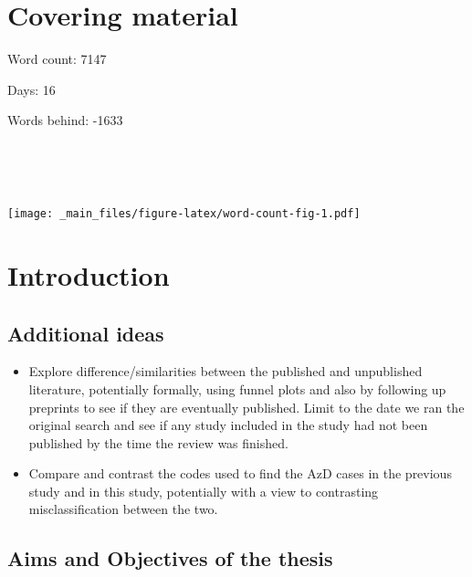 \documentclass[a4paper, twoside]{templates/ociamthesis}
\providecommand{\tightlist}{%
  \setlength{\itemsep}{0pt}\setlength{\parskip}{0pt}}
\begin{document}
\flushbottom

\hypertarget{covering-material}{%
\chapter*{Covering material}\label{covering-material}}

\adjustmtc

Word count: 7147

Days: 16

Words behind: -1633

~

~

\texttt{[image: \_main\_files/figure-latex/word-count-fig-1.pdf]}

\hypertarget{intro-heading}{%
\chapter{Introduction}\label{intro-heading}}

\minitoc 

\hypertarget{additional-ideas}{%
\section{Additional ideas}\label{additional-ideas}}

\begin{itemize}
\tightlist
\item
  Explore difference/similarities between the published and unpublished literature, potentially formally, using funnel plots and also by following up preprints to see if they are eventually published. Limit to the date we ran the original search and see if any study included in the study had not been published by the time the review was finished.
\item
  Compare and contrast the codes used to find the AzD cases in the previous study and in this study, potentially with a view to contrasting misclassification between the two.
\end{itemize}

\hypertarget{aims-and-objectives-of-the-thesis}{%
\section{Aims and Objectives of the thesis}\label{aims-and-objectives-of-the-thesis}}
\end{document}
